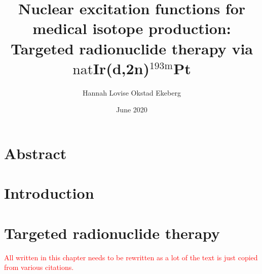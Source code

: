 \documentclass[a4paper,11pt,twoside]{book}
\title{Nuclear excitation functions for medical isotope production:\\
Targeted radionuclide therapy via $\text{nat}$Ir(d,2n)$^{193\text{m}}$Pt}
\author{Hannah Lovise Okstad Ekeberg}
\date{June 2020}
\begin{document}
\maketitle
\tableofcontents


%
%
%
%
%
%
%
%
%

\chapter{Abstract}

\chapter{Introduction}

\chapter{Targeted radionuclide therapy}
\textcolor{red}{All written in this chapter needs to be rewritten as a lot of the text is just copied from various citations.}
\end{document}
